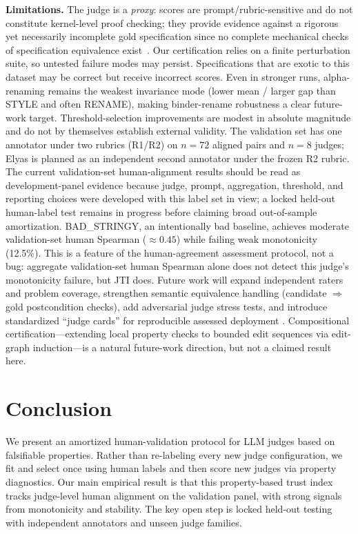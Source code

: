 \documentclass{article}
\begin{document}
\textbf{Limitations.} The judge is a \emph{proxy}: scores are prompt/rubric-sensitive and do not constitute kernel-level proof checking; they provide evidence against a rigorous yet necessarily incomplete gold specification since no complete mechanical checks of specification equivalence exist~\citep{rice1953}.
Our certification relies on a finite perturbation suite, so untested failure modes may persist. Specifications that are exotic to this dataset may be correct but receive incorrect scores.
Even in stronger runs, alpha-renaming remains the weakest invariance mode (lower mean / larger gap than STYLE and often RENAME), making binder-rename robustness a clear future-work target.
Threshold-selection improvements are modest in absolute magnitude and do not by themselves establish external validity.
The validation set has one annotator under two rubrics (R1/R2) on \(n=72\) aligned pairs and \(n=8\) judges; Elyas is planned as an independent second annotator under the frozen R2 rubric.
The current validation-set human-alignment results should be read as development-panel evidence because judge, prompt, aggregation, threshold, and reporting choices were developed with this label set in view; a locked held-out human-label test remains in progress before claiming broad out-of-sample amortization.
BAD\_STRINGY, an intentionally bad baseline, achieves moderate validation-set human Spearman (\(\approx0.45\)) while failing weak monotonicity (12.5\%).
This is a feature of the human-agreement assessment protocol, not a bug: aggregate validation-set human Spearman alone does not detect this judge's monotonicity failure, but JTI does.
Future work will expand independent raters and problem coverage, strengthen semantic equivalence handling (candidate $\Rightarrow$ gold postcondition checks), add adversarial judge stress tests, and introduce standardized ``judge cards'' for reproducible assessed deployment \citep{zhou2025graders}.
Compositional certification---extending local property checks to bounded edit sequences via edit-graph induction---is a natural future-work direction, but not a claimed result here.

\section{Conclusion}
We present an amortized human-validation protocol for LLM judges based on falsifiable properties.
Rather than re-labeling every new judge configuration, we fit and select once using human labels and then score new judges via property diagnostics.
Our main empirical result is that this property-based trust index tracks judge-level human alignment on the validation panel, with strong signals from monotonicity and stability.
The key open step is locked held-out testing with independent annotators and unseen judge families.
\end{document}
